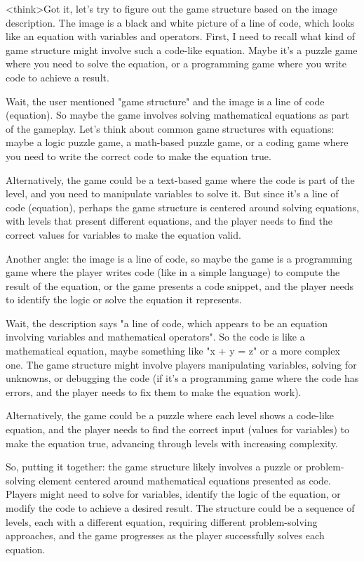 <think>Got it, let's try to figure out the game structure based on the image description. The image is a black and white picture of a line of code, which looks like an equation with variables and operators. First, I need to recall what kind of game structure might involve such a code-like equation. Maybe it's a puzzle game where you need to solve the equation, or a programming game where you write code to achieve a result.

Wait, the user mentioned "game structure" and the image is a line of code (equation). So maybe the game involves solving mathematical equations as part of the gameplay. Let's think about common game structures with equations: maybe a logic puzzle game, a math-based puzzle game, or a coding game where you need to write the correct code to make the equation true.

Alternatively, the game could be a text-based game where the code is part of the level, and you need to manipulate variables to solve it. But since it's a line of code (equation), perhaps the game structure is centered around solving equations, with levels that present different equations, and the player needs to find the correct values for variables to make the equation valid.

Another angle: the image is a line of code, so maybe the game is a programming game where the player writes code (like in a simple language) to compute the result of the equation, or the game presents a code snippet, and the player needs to identify the logic or solve the equation it represents.

Wait, the description says "a line of code, which appears to be an equation involving variables and mathematical operators". So the code is like a mathematical equation, maybe something like "x + y = z" or a more complex one. The game structure might involve players manipulating variables, solving for unknowns, or debugging the code (if it's a programming game where the code has errors, and the player needs to fix them to make the equation work).

Alternatively, the game could be a puzzle where each level shows a code-like equation, and the player needs to find the correct input (values for variables) to make the equation true, advancing through levels with increasing complexity.

So, putting it together: the game structure likely involves a puzzle or problem-solving element centered around mathematical equations presented as code. Players might need to solve for variables, identify the logic of the equation, or modify the code to achieve a desired result. The structure could be a sequence of levels, each with a different equation, requiring different problem-solving approaches, and the game progresses as the player successfully solves each equation.

